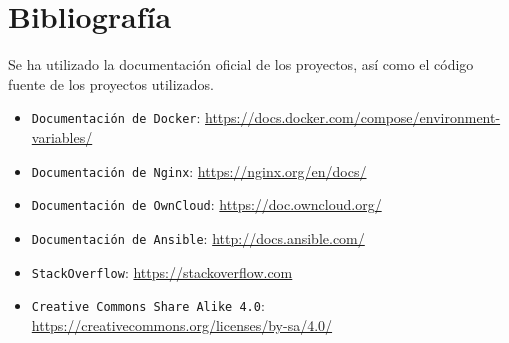 \chapter{Bibliografía}

Se ha utilizado la documentación oficial de los proyectos, así como el código fuente de los proyectos utilizados.

\begin{itemize}
\item{\tt Documentación de Docker}: \url{https://docs.docker.com/compose/environment-variables/}
\item{\tt Documentación de Nginx}: \url{https://nginx.org/en/docs/}
\item{\tt Documentación de OwnCloud}: \url{https://doc.owncloud.org/}
\item{\tt Documentación de Ansible}: \url{http://docs.ansible.com/}
\item{\tt StackOverflow}: \url{https://stackoverflow.com}
\item{\tt Creative Commons Share Alike 4.0}: \url{https://creativecommons.org/licenses/by-sa/4.0/}
\end{itemize}


